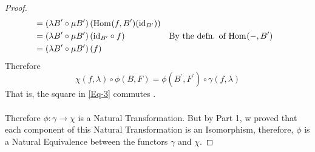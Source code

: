 \documentclass{article}
\theoremstyle{definition}
\theoremstyle{remark}
\theoremstyle{definition}
\theoremstyle{definition}
\theoremstyle{definition}
\newcommand{\Id}[1]{\text{id}_{#1}}
\newcommand{\homset}[3]{\text{Hom}_{#1}(#2,#3)}
\begin{document}
\begin{proof}
\begin{align*}
  	&= \left (\lambda B^{\prime} \circ \mu B^{\prime}\right ) (\homset{}{f}{B^{\prime}}(\Id{B^{\prime}}))\\
  	&= \left (\lambda B^{\prime} \circ \mu B^{\prime}\right )(\Id{B^{\prime}} \circ f)&& \text{By the defn. of $ \homset{}{-}{B^{\prime}} $}\\
  	&= \left (\lambda B^{\prime} \circ \mu B^{\prime}\right )(f)
  \end{align*}
Therefore 
\[\chi(f,\lambda)\circ \phi(B,F) = \phi(B^{\prime}, F^{\prime}) \circ \gamma (f,\lambda)\]
That is, the square in \eqref{Eq-3} commutes . \\\\
Therefore $ \phi: \gamma \to \chi $ is a Natural Transformation. But by Part 1, w proved that each component of this Natural Transformation is an Isomorphism, therefore, $ \phi $ is a Natural Equivalence between the functors $ \gamma $ and $ \chi $.
\end{proof}
\newpage
\end{document}

